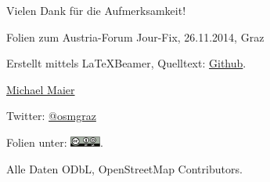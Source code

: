 \documentclass{beamer}
\begin{document}
\begin{frame}{Vielen Dank für die Aufmerksamkeit!}

  Folien zum Austria-Forum Jour-Fix, 26.11.2014, Graz
\vspace{1cm}

Erstellt mittels \LaTeX Beamer, Quelltext: \href{https://github.com/species/vortrag-osm-austriaforum}{Github}.
\vspace{1cm}

\href{mailto:michael.maier@student.tugraz.at}{Michael Maier}

Twitter: \href{https://twitter.com/osmgraz}{@osmgraz}
\vspace{1cm}

Folien unter: \includegraphics[width=1cm]{cc-by-sa.pdf}. 

\vspace{0.2cm}
Alle Daten ODbL, OpenStreetMap Contributors.

\end{frame}
\end{document}
